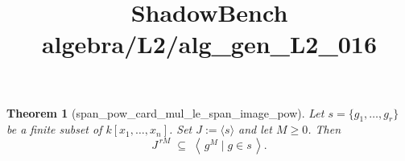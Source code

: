 \documentclass{article}
\title{ShadowBench algebra/L2/alg\_gen\_L2\_016}
\newtheorem{theorem}{Theorem}
\begin{document}
\maketitle

\begin{theorem}[span_pow_card_mul_le_span_image_pow]
Let $s=\{g_1,\dots,g_r\}$ be a finite subset of $k[x_1,\dots,x_n]$.
Set $J := \langle s\rangle$ and let $M\ge 0$. Then
\[
  J^{\,rM}
  \;\subseteq\;
  \left\langle\, g^M \mid g\in s \,\right\rangle.
\]
\end{theorem}
\end{document}
